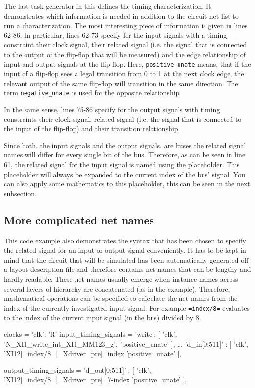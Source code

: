The last task generator in this  defines the timing
characterization.
It demonstrates which information is needed in addition to
the circuit net list to run a characterization. The most interesting piece of
information is given in lines 62-86. In particular, lines 62-73 specify for the
input signals with a timing constraint their clock signal, their related signal
(i.e. the signal that is connected to the output of the flip-flop that will be
measured) and the edge relationship of input and output signals at the
flip-flop. Here, \texttt{positive\_unate} means, that if the input of a
flip-flop sees a legal transition from 0 to 1 at the next clock edge, the
relevant output of the same flip-flop will transition in the same direction.
The term \texttt{negative\_unate} is used for the opposite relationship.

In the same sense, lines 75-86 specify for the output signals with timing
constraints their clock signal, related signal (i.e. the signal that is
connected to the input of the flip-flop) and their transition relationship.

Since both, the input signals and the output signals, are buses the related
signal names will differ for every single bit of the bus. Therefore, as can be
seen in line 61, the related signal  for the input signal
 is named using the  placeholder. This placeholder will
always be expanded to the current index of the bus' signal.
You can also apply some mathematics to this placeholder, this can be seen in
the next subsection.

\subsection{More complicated net names}

This code example also demonstrates the syntax that has been chosen to specify
the related signal for an input or output signal conveniently. It has to be
kept in mind that the circuit that will be simulated has been automatically
generated off a layout description file and therefore contains net names that
can be lengthy and hardly readable. These net names usually emerge when
instance names across several layers of hierarchy are concatenated (as in the
example). Therefore, mathematical operations can be specified to calculate the
net names from the index of the currently investigated input signal. For
example \texttt{=index/8=} evaluates to the index of the current input signal
(in the bus) divided by 8.

\begin{lstwscript}
clocks = { 'clk': 'R' }
input_timing_signals = {
	'write': [
		'clk',
		'N_XI1_write_int_XI1_MM123_g',
		'positive_unate'
	],
	...
	'd_in[0:511]' : [
		'clk',
		'XI12[=index/8=]_Xdriver_pre[=index%
		'positive_unate'
	],
}

output_timing_signals = {
	'd_out[0:511]' : [
		'clk',
		'XI12[=index/8=]_Xdriver_pre[=7-index%
		'positive_unate'
	],
}
\end{lstwscript}


